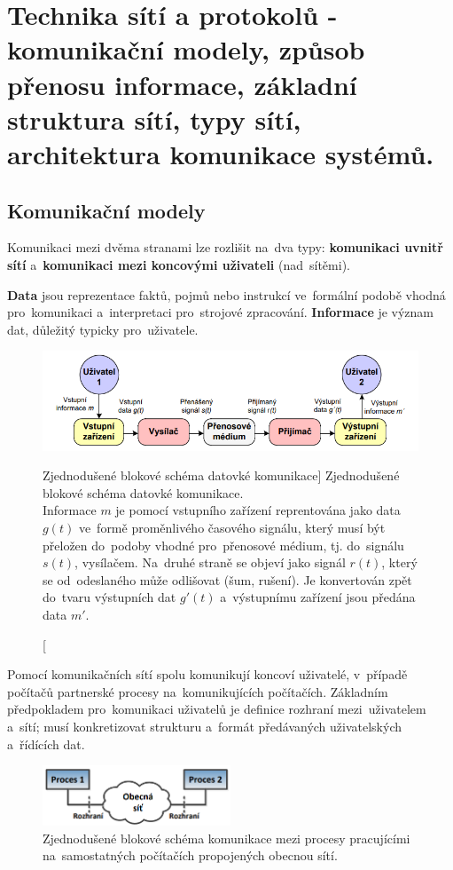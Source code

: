 \section{Technika sítí a protokolů - komunikační modely, způsob přenosu informace, základní struktura sítí, typy sítí, architektura komunikace systémů.}

\subsection{Komunikační modely}

Komunikaci mezi dvěma stranami lze rozlišit na~dva typy: \textbf{komunikaci uvnitř sítí} a~\textbf{komunikaci mezi koncovými uživateli} (nad~sítěmi).

\textbf{Data} jsou reprezentace faktů, pojmů nebo instrukcí ve~formální podobě vhodná pro~komunikaci a~interpretaci pro~strojové zpracování. \textbf{Informace} je význam dat, důležitý typicky pro~uživatele.

\begin{figure}[ht]
	\centering
	\includegraphics[width=\textwidth]{images/q01_simplified_scheme_network}
	\caption
		[Zjednodušené blokové schéma datovké komunikace]
		{Zjednodušené blokové schéma datovké komunikace. \\
		Informace $m$ je pomocí vstupního zařízení reprentována jako data $g(t)$ ve~formě proměnlivého časového signálu, který musí být přeložen do~podoby vhodné pro~přenosové médium, tj. do~signálu $s(t)$, vysílačem. Na~druhé straně se objeví jako signál $r(t)$, který se od~odeslaného může odlišovat (šum, rušení). Je konvertován zpět do~tvaru výstupních dat $g'(t)$ a~výstupnímu zařízení jsou předána data $m'$.}
	\label{q01_simplified_scheme_network}
\end{figure}

Pomocí komunikačních sítí spolu komunikují koncoví uživatelé, v~případě počítačů partnerské procesy na~komunikujících počítačích. Základním předpokladem pro~komunikaci uživatelů je definice rozhraní mezi~uživatelem a~sítí; musí konkretizovat strukturu a~formát předávaných uživatelských a~řídících dat.

\begin{figure}[ht]
	\centering
	\includegraphics[width=0.5\textwidth]{images/q01_simplified_scheme_processes}
	\caption{Zjednodušené blokové schéma komunikace mezi procesy pracujícími na~samostatných počítačích propojených obecnou sítí.}
	\label{q01_simplified_scheme_processes}
\end{figure}

